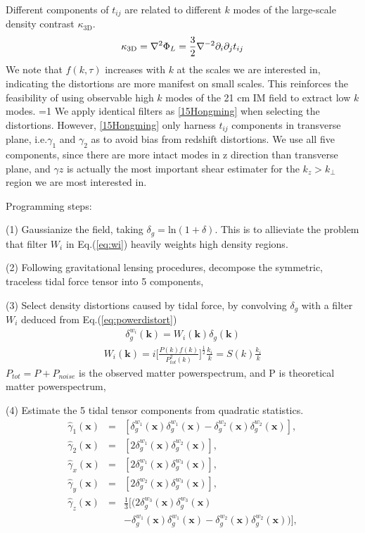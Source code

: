Different components of $t_{ij}$ are related to different $k$ modes of the large-scale density contrast $\kappa_\mathrm{3D}$.
\begin{eqnarray}
    \label{eq:largepoten}
    \kappa_\mathrm{3D}=\nabla^2\Phi_L=\frac{3}{2}\nabla^{-2}\partial_i\partial_j t_{ij}
\end{eqnarray}
We note that $f(k,\tau)$ increases with $k$ at the scales we are interested in, indicating the distortions are more manifest on small scales. This reinforces the feasibility of using observable high $k$ modes of the 21 cm IM field to extract low $k$ modes. 
=1
We apply identical filters as \ref{15Hongming} 
when selecting the distortions. 
However, \ref{15Hongming} only harness $t_{ij}$ components 
in transverse plane, i.e.$\gamma_1$ and $\gamma_2$ 
as to avoid bias from redshift distortions. 
We use all five components, since there are more intact modes in 
z direction than transverse plane, 
and $\gamma z$ is actually the most important 
shear estimater for the $k_z>k_\perp$ region 
we are most interested in.

Programming steps:\noindent

(1) Gaussianize the field, taking 
$\delta_g=\mathrm{ln}(1+\delta)$. 
This is to allieviate the problem that filter $W_i$ in Eq.(\ref{eq:wi}) heavily weights high density regions.

(2) Following gravitational lensing procedures, decompose the symmetric, traceless tidal force tensor into 5 components, 

(3) Select density distortions caused by tidal force, 
by convolving $\delta_g$ with a filter $W_i$ 
deduced from Eq.(\ref{eq:powerdistort}) 
\begin{eqnarray}
\delta^{w_i}_g(\bm{k})=W_i(\bm{k})\delta_g(\bm{k}) 
\end{eqnarray}
\begin{eqnarray}
\label{eq:wi}
W_i(\bm{k})=i \bigg[\frac{P(k)f(k)}{P_{tot}^2(k)}\bigg]^{\frac{1}{2}}\frac{k_i}{k}
=S(k)\frac{k_i}{k}\nonumber
\end{eqnarray}
$P_{tot}=P+P_{noise}$ is the observed matter powerspectrum, 
and P is theoretical matter powerspectrum,

(4) Estimate the 5 tidal tensor components from quadratic statistics.
\begin{eqnarray}
\label{eq:gamma}
\hat{\gamma}_1(\bm{x})&=&
[{\delta}^{w_1}_g(\bm{x}){\delta}^{w_1}_g(\bm{x})-
{\delta}^{w_2}_g(\bm{x}){\delta}^{w_2}_g(\bm{x})],\nonumber\\
\hat{\gamma}_2(\bm{x})&=&
[2{\delta}^{w_1}_g(\bm{x}){\delta}^{w_2}_g(\bm{x})],\nonumber\\
\hat{\gamma}_x(\bm{x})&=&
[2{\delta}^{w_1}_g(\bm{x}){\delta}^{w_3}_g(\bm{x})],\\
\hat{\gamma}_y(\bm{x})&=&
[2{\delta}^{w_2}_g(\bm{x}){\delta}^{w_3}_g(\bm{x})],\nonumber\\
\hat{\gamma}_z(\bm{x})&=&
\frac{1}{3}[(2{\delta}^{w_3}_g(\bm{x}){\delta}^{w_3}_g(\bm{x})\nonumber\\
&&-{\delta}^{w_1}_g(\bm{x}){\delta}^{w_1}_g(\bm{x})
-{\delta}^{w_2}_g(\bm{x}){\delta}^{w_2}_g(\bm{x}))],\nonumber
\end{eqnarray}

